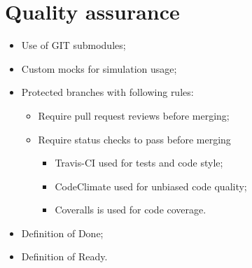 \section{Quality assurance}

\begin{frame}{\secname}
	\begin{itemize}
		\item Use of GIT submodules;
		\item Custom mocks for simulation usage;
		\item Protected branches with following rules:
			\begin{itemize}
				\item Require pull request reviews before merging;
				\item Require status checks to pass before merging
				\begin{itemize}
					\item Travis-CI used for tests and code style;
					\item CodeClimate used for unbiased code quality;
					\item Coveralls is used for code coverage.
				\end{itemize}
			\end{itemize}
		\item Definition of Done;
		\item Definition of Ready.
	\end{itemize}
\end{frame}
